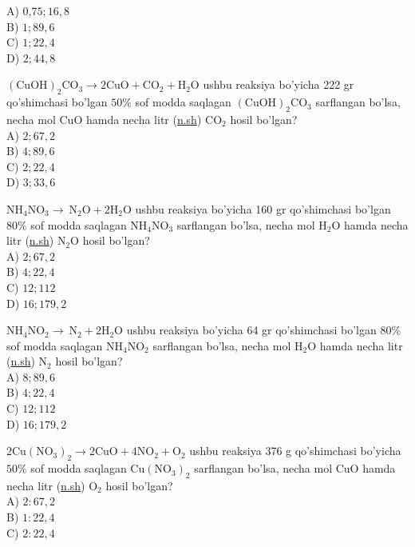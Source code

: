 A) 0,$75 ; 16,8$\\
B) $1 ; 89,6$\\
C) $1 ; 22,4$\\
D) $2 ; 44,8$
  \item $(\mathrm{CuOH})_{2} \mathrm{CO}_{3} \rightarrow 2 \mathrm{CuO}+\mathrm{CO}_{2}+\mathrm{H}_{2} \mathrm{O}$ ushbu reaksiya bo'yicha 222 gr qo'shimchasi bo'lgan $50 \%$ sof modda saqlagan $(\mathrm{CuOH})_{2} \mathrm{CO}_{3}$ sarflangan bo'lsa, necha mol CuO hamda necha litr (\href{http://n.sh}{n.sh}) $\mathrm{CO}_{2}$ hosil bo'lgan?\\
A) $2 ; 67,2$\\
B) $4 ; 89,6$\\
C) $2 ; 22,4$\\
D) $3 ; 33,6$
  \item $\mathrm{NH}_{4} \mathrm{NO}_{3} \rightarrow \mathrm{~N}_{2} \mathrm{O}+2 \mathrm{H}_{2} \mathrm{O}$ ushbu reaksiya bo'yicha 160 gr qo'shimchasi bo'lgan $80 \%$ sof modda saqlagan $\mathrm{NH}_{4} \mathrm{NO}_{3}$ sarflangan bo'lsa, necha mol $\mathrm{H}_{2} \mathrm{O}$ hamda necha litr (\href{http://n.sh}{n.sh}) $\mathrm{N}_{2} \mathrm{O}$ hosil bo'lgan?\\
A) $2 ; 67,2$\\
B) $4 ; 22,4$\\
C) $12 ; 112$\\
D) $16 ; 179,2$
  \item $\mathrm{NH}_{4} \mathrm{NO}_{2} \rightarrow \mathrm{~N}_{2}+2 \mathrm{H}_{2} \mathrm{O}$ ushbu reaksiya bo'yicha 64 gr qo'shimchasi bo'lgan $80 \%$ sof modda saqlagan $\mathrm{NH}_{4} \mathrm{NO}_{2}$ sarflangan bo'lsa, necha mol $\mathrm{H}_{2} \mathrm{O}$ hamda necha litr (\href{http://n.sh}{n.sh}) $\mathrm{N}_{2}$ hosil bo'lgan?\\
A) $8 ; 89,6$\\
B) $4 ; 22,4$\\
C) $12 ; 112$\\
D) $16 ; 179,2$
  \item $2 \mathrm{Cu}\left(\mathrm{NO}_{3}\right)_{2} \rightarrow 2 \mathrm{CuO}+4 \mathrm{NO}_{2}+\mathrm{O}_{2}$ ushbu reaksiya 376 g qo'shimchasi bo'yicha $50 \%$ sof modda saqlagan $\mathrm{Cu}\left(\mathrm{NO}_{3}\right)_{2}$ sarflangan bo'lsa, necha mol CuO hamda necha litr (\href{http://n.sh}{n.sh}) $\mathrm{O}_{2}$ hosil bo'lgan?\\
A) $2: 67,2$\\
B) $1: 22,4$\\
C) $2: 22,4$\\
